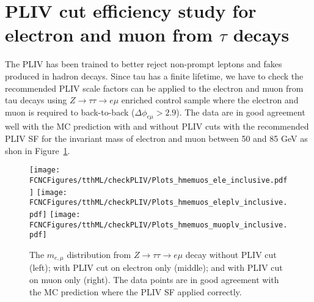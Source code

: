 \section{PLIV cut efficiency study for electron and muon from $\tau$ decays}
\label{sec:CheckPLIV}

The PLIV has been trained to better reject non-prompt leptons and fakes produced in hadron decays. Since tau has a finite lifetime, we have to check the
recommended PLIV scale factors can be applied to the electron and muon from tau decays using $Z\rightarrow \tau\tau\rightarrow e\mu$ enriched control sample
where the electron and muon is required to back-to-back ($\Delta\phi_{e\mu}>2.9$). The data are in good agreement well with the MC prediction with and without
PLIV cuts with the recommended PLIV SF for the invariant mass of electron and muon between 50 and 85 GeV as shon in Figure~\ref{fig:ap9_checkpliv}. 


\begin{figure}[H]
\centering
\texttt{[image: \\FCNCFigures/tthML/checkPLIV/Plots\_hmemuos\_ele\_inclusive.pdf]}
\texttt{[image: \\FCNCFigures/tthML/checkPLIV/Plots\_hmemuos\_eleplv\_inclusive.pdf]}
\texttt{[image: \\FCNCFigures/tthML/checkPLIV/Plots\_hmemuos\_muoplv\_inclusive.pdf]}
\caption{ The $m_{e,\mu}$ distribution from $Z\rightarrow\tau\tau\rightarrow e\mu$ decay without PLIV cut (left); with PLIV cut on electron only (middle); and
  with PLIV cut on muon only (right). The data points are in good agreement with the MC prediction where the PLIV SF applied correctly.}
\label{fig:ap9_checkpliv}
\end{figure}

